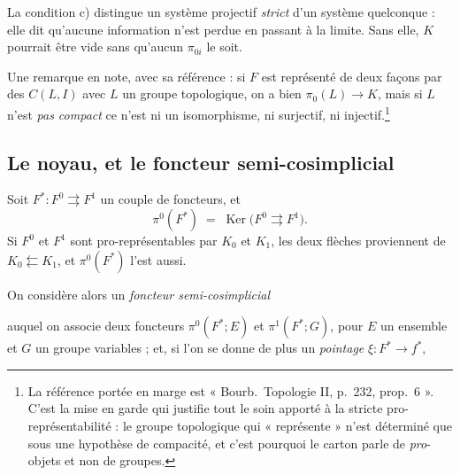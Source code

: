 \documentclass[11pt,a4paper]{article}
\begin{document}
La condition c) distingue un système projectif \emph{strict} d'un
système quelconque : elle dit qu'aucune information n'est perdue en passant à
la limite. Sans elle, $K$ pourrait être vide sans qu'aucun $\pi_{0i}$ le soit.

Une remarque en note, avec sa référence : si $F$ est représenté de deux façons
par des $C(L, I)$ avec $L$ un groupe topologique, on a bien
$\pi_{0}(L) \to K$, mais si $L$ n'est \emph{pas compact} ce n'est ni un
isomorphisme, ni surjectif, ni injectif.\footnote{La référence portée en marge
est « Bourb.\ Topologie II, p.\ 232, prop.\ 6 ». C'est la mise en garde qui
justifie tout le soin apporté à la stricte pro-représentabilité : le groupe
topologique qui « représente » n'est déterminé que sous une hypothèse de
compacité, et c'est pourquoi le carton parle de \emph{pro}-objets et non de
groupes.}

\subsection*{Le noyau, et le foncteur semi-cosimplicial}

Soit $F^{*} : F^{0} \rightrightarrows F^{1}$ un couple de foncteurs, et
\[
  \pi^{0}(F^{*}) \;=\; \operatorname{Ker}\bigl(F^{0} \rightrightarrows
  F^{1}\bigr) .
\]
Si $F^{0}$ et $F^{1}$ sont pro-représentables par $K_{0}$ et $K_{1}$, les deux
flèches proviennent de $K_{0} \leftleftarrows K_{1}$, et $\pi^{0}(F^{*})$ l'est
aussi.

On considère alors un \emph{foncteur semi-cosimplicial}


auquel on associe deux foncteurs $\pi^{0}(F^{*}; E)$ et $\pi^{1}(F^{*}; G)$,
pour $E$ un ensemble et $G$ un groupe variables ; et, si l'on se donne de plus
un \emph{pointage} $\xi : F^{*} \to f^{*}$,

\end{document}

